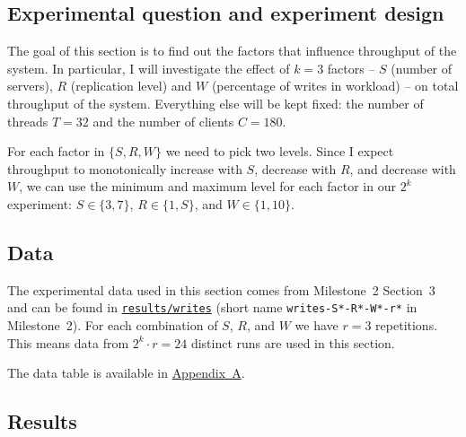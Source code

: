\documentclass[11pt]{article}
\begin{document}
\subsection{Experimental question and experiment design}
The goal of this section is to find out the factors that influence throughput of the system. In particular, I will investigate the effect of $k=3$ factors -- $S$ (number of servers), $R$ (replication level) and $W$ (percentage of writes in workload) -- on total throughput of the system. Everything else will be kept fixed: the number of threads $T=32$ and the number of clients $C=180$.

For each factor in $\{S,R,W\}$ we need to pick two levels. Since I expect throughput to monotonically increase with $S$, decrease with $R$, and decrease with $W$, we can use the minimum and maximum level for each factor in our $2^k$ experiment: $S \in \{3, 7\}$, $R \in \{1, S\}$, and $W \in \{1, 10\}$.


\subsection{Data}

The experimental data used in this section comes from Milestone~2 Section~3 and can be found in \texttt{\href{https://gitlab.inf.ethz.ch/pungast/asl-fall16-project/tree/master/results/writes}{results/writes}} (short name \texttt{writes-S*-R*-W*-r*} in Milestone~2). For each combination of $S$, $R$, and $W$ we have $r=3$ repetitions. This means data from $2^k \cdot r = 24$ distinct runs are used in this section.

The data table is available in \hyperref[sec:appa]{Appendix~A}.

%

\subsection{Results}
\end{document}
